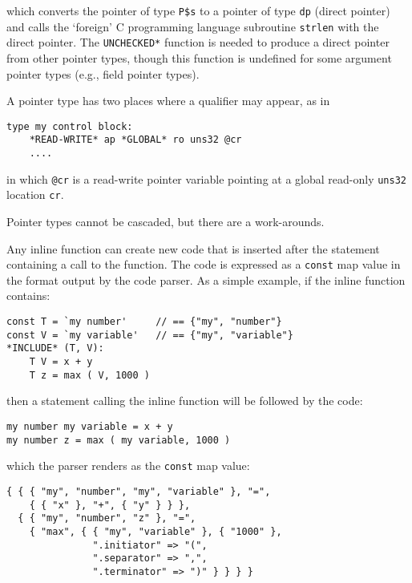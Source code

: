 \documentclass[12pt]{article}
\newenvironment{indpar}[1][0.3in]%
	{\begin{list}{}%
		     {\setlength{\itemsep}{0in}%
		      \setlength{\topsep}{0in}%
		      \setlength{\parsep}{1ex}%
		      \setlength{\labelwidth}{#1}%
		      \setlength{\leftmargin}{#1}%
		      \addtolength{\leftmargin}{\labelsep}}%
	 \item}%
	{\end{list}}
\begin{document}
which converts the pointer of type {\tt P\$s} to a pointer of
type {\tt dp} (direct pointer) and calls the `foreign' C programming
language subroutine {\tt strlen} with the direct pointer.
The {\tt *UNCHECKED*} function is needed to produce a direct pointer
from other pointer types, though this function is undefined
for some argument pointer types (e.g., field pointer types).

A pointer type
has two places where a qualifier may appear, as in

\begin{indpar}\begin{verbatim}
type my control block:
    *READ-WRITE* ap *GLOBAL* ro uns32 @cr
    ....
\end{verbatim}\end{indpar}
in which {\tt @cr} is a read-write pointer variable pointing at a global
read-only {\tt uns32} location {\tt cr}.

Pointer types cannot be cascaded, but there are a work-arounds.

Any inline function can create new code that is inserted
after the statement containing a call to the function.
The code is expressed as a {\tt const} map value in
the format output by the code parser.  As a simple
example, if the inline function contains:
\begin{indpar}\begin{verbatim}
const T = `my number'     // == {"my", "number"}
const V = `my variable'   // == {"my", "variable"}
*INCLUDE* (T, V):
    T V = x + y
    T z = max ( V, 1000 )
\end{verbatim}\end{indpar}
then a statement calling the inline function will be
followed by the code:
\begin{indpar}\begin{verbatim}
my number my variable = x + y
my number z = max ( my variable, 1000 )
\end{verbatim}\end{indpar}
which the parser renders as the {\tt const} map value:
\begin{indpar}\begin{verbatim}
{ { { "my", "number", "my", "variable" }, "=",
    { { "x" }, "+", { "y" } } },
  { { "my", "number", "z" }, "=",
    { "max", { { "my", "variable" }, { "1000" },
               ".initiator" => "(",
               ".separator" => ",",
               ".terminator" => ")" } } } }
\end{verbatim}\end{indpar}
\end{document}
